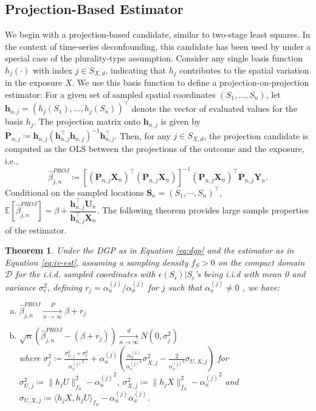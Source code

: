 \documentclass[
  12pt]{article}
\newcommand{\pnlim}{\xrightarrow[n \to \infty]{P}}
\newcommand{\dnlim}{\xrightarrow[n \to \infty]{d}}
\newcommand{\calD}{\mathcal{D}}
\newcommand{\bX}{\boldsymbol{X}}
\newcommand{\bY}{\boldsymbol{Y}}
\newcommand{\bh}{\boldsymbol{h}}
\newcommand{\bS}{\boldsymbol{S}}
\newcommand{\bU}{\boldsymbol{U}}
\newcommand{\bP}{\boldsymbol{P}}
\newcommand{\E}{\mathbb{E}}
\newtheorem{theorem}{Theorem}
\begin{document}
\subsection{Projection-Based Estimator}\label{sec:projn-method}
We begin with a projection-based candidate, similar to two-stage least squares. In the context of time-series deconfounding, this candidate has been used by \citep{schur2025decor} under a special case of the plurality-type assumption. Consider any single basis function $h_j(\cdot)$ with index $j \in S_{X,d}$, indicating that $h_j$ contributes to the spatial variation in the exposure $X$. 
We use this basis function to define a projection-on-projection estimator: For a given set of sampled spatial coordinates $(S_1, \dots, S_n)$, let $\bh_{n,j} = (h_j(S_1), \dots, h_j(S_n))^\top$ denote the vector of evaluated values for the basis $h_j$. The projection matrix onto $\bh_{n,j}$ is given by
$\bP_{n,j} \coloneqq \bh_{n,j}\left({\bh_{n,j}^\top\bh_{n,j}}\right)^{
-1}\bh_{n,j}^\top.$
Then, for any $j \in S_{X,d}$, the projection candidate is computed as the OLS between the projections of the outcome and the exposure, i.e., 
\begin{equation}\label{eq:iv-est}
    \hat{\beta}_{j,n}^{PROJ}\coloneqq \left[\left(\bP_{n,j}\bX_{n}\right)^\top\left(\bP_{n,j}\bX_{n}\right)\right]^{-1}\left(\bP_{n,j}\bX_{n}\right)^\top\bP_{n,j}\bY_{n}.
\end{equation}
Conditional on the sampled locations $\bS_n =(S_1,\cdots,S_n)^\top$,
$\E\left[\hat{\beta}_{j,n}^{PROJ}\right] =
    \beta + \dfrac{\bh_{n,j}^\top\bU_{n}}{\bh_{n,j}^\top\bX_{n}}$. The following theorem provides large sample properties of the estimator. 
\begin{theorem}\label{thm:IV-est-prop}
    Under the DGP as in Equation \ref{eq:dgp} and the estimator as in Equation \ref{eq:iv-est}, assuming a sampling density $f_S > 0$ on the compact domain $\calD$ for the i.i.d. sampled coordinates with $\epsilon(S_i)|S_i$'s being i.i.d with mean 0 and variance $\sigma^2_\epsilon$, defining $r_{j} = \alpha_u^{(j)}/\alpha_x^{(j)}$ for $j$ such that $\alpha_x^{(j)}\neq 0$ 
    , we have:
    \begin{enumerate}[(a)]
        \item $\hat{\beta}_{j,n}^{PROJ}\pnlim \beta + r_j$
        \item $    \sqrt{n}\left(\hat{\beta}_{j,n}^{PROJ}-(\beta+ r_{j})\right) \dnlim N\left(0, \sigma^2_{j}\right)$
            \\where $\sigma^2_{j} \coloneqq \frac{\sigma^2_{U,j} + \sigma^2_\epsilon}{{\alpha_x^{(j)}}^2} + \alpha_u^{(j)}\left(\frac{\alpha_u^{(j)}}{{\alpha_x^{(j)}}^4}\sigma^2_{X,j} - \frac{2}{{\alpha_x^{(j)}}^3}\sigma_{U,X,j}\right)$ for 
$\sigma^2_{U,j}\coloneqq \|h_j U\|^2_{f_S} - {\alpha_u^{(j)}}^2$, $\sigma^2_{X,j}\coloneqq \|h_j X\|^2_{f_S} - {\alpha_x^{(j)}}^2$ and $\sigma_{U,X,j}\coloneqq \langle h_jX, h_jU\rangle_{f_S} - {\alpha_u^{(j)}}{\alpha_x^{(j)}}$.
\end{enumerate}
\end{theorem}
\end{document}
